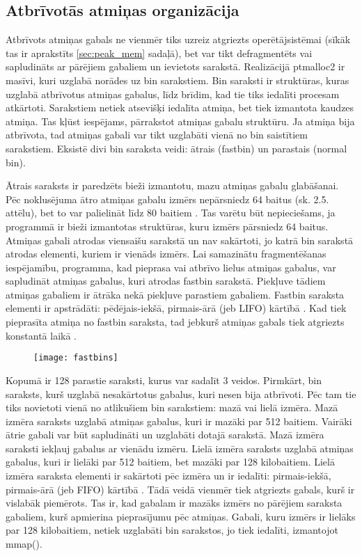  \subsection{Atbrīvotās atmiņas organizācija}
 \label{subsec:bin_saraksti}
Atbrīvots atmiņas gabals ne vienmēr tiks uzreiz atgriezts operētājsistēmai (sīkāk tas ir aprakstīts \ref{sec:peak_mem} sadaļā), bet var tikt defragmentēts vai sapludināts ar pārējiem gabaliem un ievietots sarakstā. 
Realizācijā ptmalloc2 ir masīvi, kuri uzglabā norādes uz bin sarakstiem.
Bin saraksti ir struktūras, kuras uzglabā atbrīvotus atmiņas gabalus, līdz brīdim, kad tie tiks iedalīti procesam atkārtoti.
Sarakstiem netiek atsevišķi iedalīta atmiņa, bet tiek izmantota kaudzes atmiņa.
Tas kļūst iespējams, pārrakstot atmiņas gabalu struktūru.
Ja atmiņa bija atbrīvota, tad atmiņas gabali var tikt uzglabāti vienā no bin saistītiem sarakstiem.
Eksistē divi bin saraksta veidi: ātrais (fastbin) un parastais (normal bin).


Ātrais saraksts ir paredzēts bieži izmantotu, mazu atmiņas gabalu glabāšanai.
Pēc noklusējuma ātro atmiņas gabalu izmērs nepārsniedz 64 baitus (sk. 2.5. attēlu), bet to var palielināt līdz 80 baitiem \cite {MALLOC}. 
Tas varētu būt nepieciešams, ja programmā ir bieži izmantotas struktūras, kuru izmērs pārsniedz 64 baitus.
Atmiņas gabali atrodas viensaišu sarakstā un nav sakārtoti, jo katrā bin sarakstā atrodas elementi, kuriem ir vienāds izmērs.
Lai samazinātu fragmentēšanas iespējamību, programma, kad pieprasa vai atbrīvo lielus atmiņas gabalus, var sapludināt atmiņas gabalus, kuri atrodas fastbin sarakstā.
Piekļuve tādiem atmiņas gabaliem ir ātrāka nekā piekļuve parastiem gabaliem. 
Fastbin saraksta elementi ir apstrādāti: pēdējais-iekšā, pirmais-ārā (jeb LIFO) kārtībā \cite {MALLOC}.
Kad tiek pieprasīta atmiņa no fastbin saraksta, tad jebkurš atmiņas gabals tiek atgriezts konstantā laikā  \cite {ACCA}.
\begin{figure}[h]
\begin{center}
\texttt{[image: fastbins]}
\end{center}
\caption{\textbf{\fontsize{11}{12}\selectfont {Ātrais saraksts}}}
\label{fig:fastbin}
\end{figure}

Kopumā ir 128 parastie saraksti, kurus var sadalīt 3 veidos. 
Pirmkārt, bin saraksts, kurš uzglabā nesakārtotus gabalus, kuri nesen bija atbrīvoti.  
Pēc tam tie tiks novietoti vienā no atlikušiem bin sarakstiem: mazā vai lielā izmēra. 
Mazā izmēra saraksts uzglabā atmiņas gabalus, kuri ir mazāki par 512 baitiem. 
Vairāki ātrie gabali var būt sapludināti un uzglabāti dotajā sarakstā. 
Mazā izmēra saraksti iekļauj gabalus ar vienādu izmēru. 
Lielā izmēra saraksts uzglabā atmiņas gabalus, kuri ir lielāki par 512 baitiem, bet mazāki par 128 kilobaitiem. 
Lielā izmēra saraksta elementi ir sakārtoti pēc izmēra un ir iedalīti: pirmais-iekšā, pirmais-ārā (jeb FIFO) kārtībā \cite {MALLOC}. 
Tādā veidā vienmēr tiek atgriezts gabals, kurš ir vislabāk piemērots.
Tas ir, kad gabalam ir mazāks izmērs no pārējiem saraksta gabaliem, kurš apmierina pieprasījumu pēc atmiņas.
Gabali, kuru izmērs ir lielāks par 128 kilobaitiem, netiek uzglabāti bin sarakstos, jo tiek iedalīti, izmantojot mmap(). 




